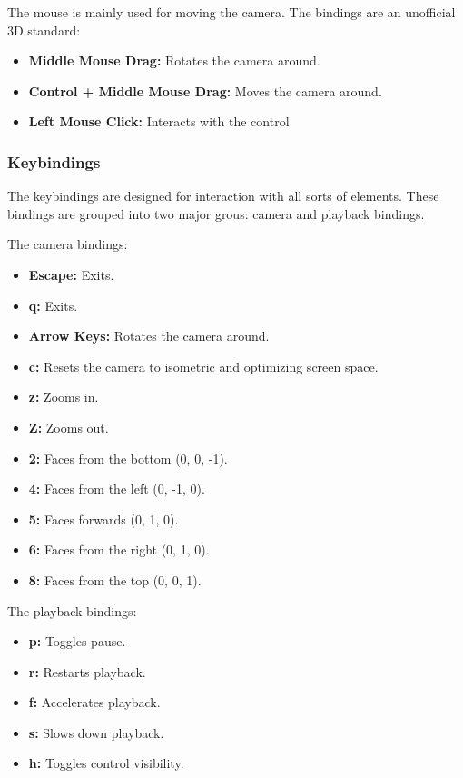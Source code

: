 \documentclass[a4paper,11pt]{article}
\begin{document}
The mouse is mainly used for moving the camera. The bindings are an unofficial 3D standard:

\begin{itemize}
\item \textbf{Middle Mouse Drag:} Rotates the camera around.
\item \textbf{Control + Middle Mouse Drag:} Moves the camera around.
\item \textbf{Left Mouse Click:} Interacts with the control
\end{itemize}

\subsubsection{Keybindings}

The keybindings are designed for interaction with all sorts of elements. These bindings are grouped into two major grous: camera and playback bindings.

The camera bindings:

\begin{itemize}
\item \textbf{Escape:} Exits.
\item \textbf{q:} Exits.
\item \textbf{Arrow Keys:} Rotates the camera around.
\item \textbf{c:} Resets the camera to isometric and optimizing screen space.
\item \textbf{z:} Zooms in.
\item \textbf{Z:} Zooms out.
\item \textbf{2:} Faces from the bottom (0, 0, -1).
\item \textbf{4:} Faces from the left (0, -1, 0).
\item \textbf{5:} Faces forwards (0, 1, 0).
\item \textbf{6:} Faces from the right (0, 1, 0).
\item \textbf{8:} Faces from the top (0, 0, 1).
\end{itemize}

The playback bindings:

\begin{itemize}
\item \textbf{p:} Toggles pause.
\item \textbf{r:} Restarts playback.
\item \textbf{f:} Accelerates playback.
\item \textbf{s:} Slows down playback.
\item \textbf{h:} Toggles control visibility.
\end{itemize}
\end{document}
